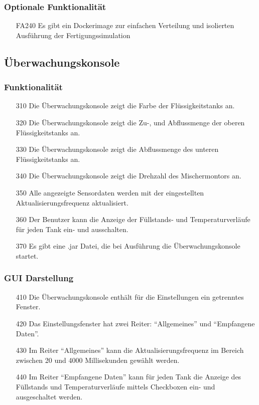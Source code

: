 \documentclass[parskip=full]{scrartcl}
\begin{document}
\subsubsection{Optionale Funktionalität}
\label{fertigung-optional}
\begin{enumerate}
\item[FA240] Es gibt ein Dockerimage zur einfachen Verteilung und isolierten Ausführung der Fertigungssimulation
\end{enumerate}

\subsection{Überwachungskonsole}
\subsubsection{Funktionalität}
\begin{enumerate}
\item[310] Die Überwachungskonsole zeigt die Farbe der Flüssigkeitstanks an.
\item[320] Die Überwachungskonsole zeigt die Zu-, und Abflussmenge der oberen Flüssigkeitstanks an.
\item[330] Die Überwachungskonsole zeigt die Abflussmenge des unteren Flüssigkeitstanks an.
\item[340] Die Überwachungskonsole zeigt die Drehzahl des Mischermontors an.
\item[350] Alle angezeigte Sensordaten werden mit der eingestellten Aktualisierungsfrequenz aktualisiert.
\item[360] Der Benutzer kann die Anzeige der Füllstands- und Temperaturverläufe für jeden Tank ein- und ausschalten.
\item[370] Es gibt eine .jar Datei, die bei Ausführung die Überwachungskonsole startet.
\end{enumerate}
\subsubsection{GUI Darstellung}
\begin{enumerate}
\item[410] Die Überwachungskonsole enthält für die Einstellungen ein getrenntes Fenster.
\item[420] Das Einstellungsfenster hat zwei Reiter: ``Allgemeines'' und ``Empfangene Daten''.
\item[430] Im Reiter ``Allgemeines'' kann die Aktualisierungsfrequenz im Bereich zwischen 20 und 4000 Millisekunden gewählt werden.
\item[440] Im Reiter ``Empfangene Daten'' kann für jeden Tank die Anzeige des Füllstands und Temperaturverläufe mittels Checkboxen ein- und ausgeschaltet werden.
\end{enumerate}
\end{document}
